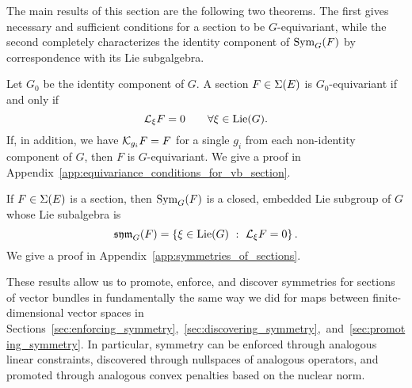 \documentclass[twoside,11pt]{article}
\begin{document}
The main results of this section are the following two theorems.
The first gives necessary and sufficient conditions for a section to be $G$-equivariant, while the
second completely characterizes the identity component of $\operatorname{Sym}_G(F)$ by correspondence with its Lie subgalgebra.
\begin{theorem}
    \label{thm:equivariance_conditions_for_vb_section}
    Let $G_0$ be the identity component of $G$. 
    A section $F \in \operatorname{\Sigma}(E)$ is $G_0$-equivariant if and only if
    \begin{equation}
        {\mathcal{L}}_{\xi} F = 0 \qquad \forall \xi \in \operatorname{Lie}(G).
    \end{equation}
    If, in addition, we have ${\mathcal{K}}_{g_i} F = F$ for a single $g_i$ from each non-identity component of $G$, then $F$ is $G$-equivariant.
    We give a proof in Appendix~\ref{app:equivariance_conditions_for_vb_section}.
\end{theorem}
\begin{theorem}
    \label{thm:symmetries_of_sections}
    If $F \in \operatorname{\Sigma}(E)$ is a section, then $\operatorname{Sym}_G(F)$ is a closed, embedded Lie subgroup of $G$ whose Lie subalgebra is
    \begin{equation}
        \operatorname{\mathfrak{sym}}_G(F) = \left\{ \xi \in \operatorname{Lie}(G) \ : \ {\mathcal{L}}_{\xi} F = 0 \right\}.
        \label{eqn:sym_G_for_vb_section}
    \end{equation}
    We give a proof in Appendix~\ref{app:symmetries_of_sections}.
\end{theorem}
These results allow us to promote, enforce, and discover symmetries for sections of vector bundles in fundamentally the same way we did for maps between finite-dimensional vector spaces in Sections~\ref{sec:enforcing_symmetry},~\ref{sec:discovering_symmetry},~and~\ref{sec:promoting_symmetry}.
In particular, symmetry can be enforced through analogous linear constraints, discovered through nullspaces of analogous operators, and promoted through analogous convex penalties based on the nuclear norm.
\end{document}
